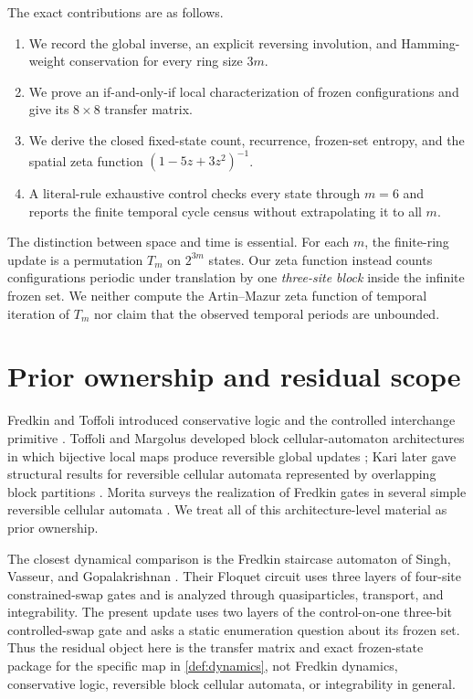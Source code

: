 \documentclass[11pt,a4paper]{amsart}
\theoremstyle{definition}
\theoremstyle{remark}
\begin{document}
The exact contributions are as follows.
\begin{enumerate}
\item We record the global inverse, an explicit reversing involution, and
Hamming-weight conservation for every ring size $3m$.
\item We prove an if-and-only-if local characterization of frozen
configurations and give its $8\times8$ transfer matrix.
\item We derive the closed fixed-state count, recurrence, frozen-set entropy,
and the spatial zeta function $(1-5z+3z^2)^{-1}$.
\item A literal-rule exhaustive control checks every state through $m=6$ and
reports the finite temporal cycle census without extrapolating it to all $m$.
\end{enumerate}

The distinction between space and time is essential.  For each $m$, the
finite-ring update is a permutation $T_m$ on $2^{3m}$ states.  Our zeta
function instead counts configurations periodic under translation by one
\emph{three-site block} inside the infinite frozen set.  We neither compute
the Artin--Mazur zeta function of temporal iteration of $T_m$ nor claim that
the observed temporal periods are unbounded.

\section{Prior ownership and residual scope}\label{sec:ownership}

Fredkin and Toffoli introduced conservative logic and the controlled
interchange primitive \cite{FredkinToffoli1982}.  Toffoli and Margolus
developed block cellular-automaton architectures in which bijective local
maps produce reversible global updates \cite{ToffoliMargolus1987}; Kari later
gave structural results for reversible cellular automata represented by
overlapping block partitions \cite{Kari1999}.  Morita surveys the realization
of Fredkin gates in several simple reversible cellular automata
\cite{Morita2022}.  We treat all of this architecture-level material as prior
ownership.

The closest dynamical comparison is the Fredkin staircase automaton of Singh,
Vasseur, and Gopalakrishnan \cite{SinghEtAl2023}.  Their Floquet circuit uses
three layers of four-site constrained-swap gates and is analyzed through
quasiparticles, transport, and integrability.  The present update uses two
layers of the control-on-one three-bit controlled-swap gate and asks a static
enumeration question about its frozen set.  Thus the residual object here is
the transfer matrix and exact frozen-state package for the specific map in
\cref{def:dynamics}, not Fredkin dynamics, conservative logic, reversible
block cellular automata, or integrability in general.
\end{document}
